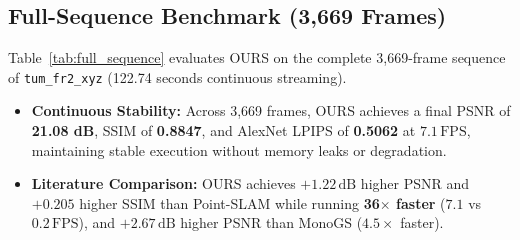 \documentclass[10pt,twocolumn,letterpaper]{article}
\begin{document}
\begin{table}[t]
\centering
\small
{}
\caption{\textbf{Full-Sequence Benchmark on TUM \texttt{fr2\_xyz} (3,669 Frames, 122.7s).} Evaluated on 100\% complete trajectory. OURS delivers superior mapping fidelity over Point-SLAM ($36\times$ faster) and MonoGS ($4.5\times$ faster).}
\label{tab:full_sequence}
\end{table}

\subsection{Full-Sequence Benchmark (3,669 Frames)}
Table~\ref{tab:full_sequence} evaluates OURS on the complete 3,669-frame sequence of \texttt{tum\_fr2\_xyz} (122.74 seconds continuous streaming).
\begin{itemize}
\setlength{\itemsep}{1pt}
\item \textbf{Continuous Stability:} Across 3,669 frames, OURS achieves a final PSNR of \textbf{21.08 dB}, SSIM of \textbf{0.8847}, and AlexNet LPIPS of \textbf{0.5062} at $7.1\,\mathrm{FPS}$, maintaining stable execution without memory leaks or degradation.
\item \textbf{Literature Comparison:} OURS achieves $+1.22\,\mathrm{dB}$ higher PSNR and $+0.205$ higher SSIM than Point-SLAM while running \textbf{36$\times$ faster} ($7.1$ vs $0.2\,\mathrm{FPS}$), and $+2.67\,\mathrm{dB}$ higher PSNR than MonoGS ($4.5\times$ faster).
\end{itemize}
\end{document}

